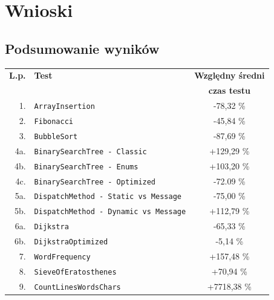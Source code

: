 \documentclass[mgr, shortabstract]{iithesis}
\begin{document}
\chapter{Wnioski}
\label{ch:wnioski}

\section{Podsumowanie wyników}

\begin{table}[!ht]
    \begin{tabularx}{1.0\textwidth}{ rXc } 
        \hline
        \textbf{L.p.} & \textbf{Test}  & \textbf{Względny średni} \\
                        &                & \textbf{czas testu} \\
        \hline
        1. & \texttt{ArrayInsertion}                         & \textcolor{MTGreen}{-78,32 \%}    \\ 
        2. & \texttt{Fibonacci}                              & \textcolor{MTGreen}{-45,84 \%}    \\ 
        3. & \texttt{BubbleSort}                             & \textcolor{MTGreen}{-87,69 \%}    \\ 
        4a. & \texttt{BinarySearchTree - Classic }            & \textcolor{MTRed}{+129,29 \%}     \\ 
        4b. & \texttt{BinarySearchTree - Enums }              & \textcolor{MTRed}{+103,20 \%}     \\ 
        4c. & \texttt{BinarySearchTree - Optimized}           & \textcolor{MTGreen}{-72.09 \%}    \\ 
        5a. & \texttt{DispatchMethod - Static vs Message}     & \textcolor{MTGreen}{-75,00 \%}    \\ 
        5b. & \texttt{DispatchMethod - Dynamic vs Message}    & \textcolor{MTRed}{+112,79 \%}     \\ 
        6a. & \texttt{Dijkstra}                               & \textcolor{MTGreen}{-65,33 \%}    \\ 
        6b. & \texttt{DijkstraOptimized}                      & \textcolor{MTGreen}{-5,14 \%}     \\ 
        7. & \texttt{WordFrequency}                          & \textcolor{MTRed}{+157,48 \%}     \\ 
        8. & \texttt{SieveOfEratosthenes}                    & \textcolor{MTRed}{+70,94 \%}      \\ 
        9. & \texttt{CountLinesWordsChars}                   & \textcolor{MTRed}{+7718,38 \%}    \\ 

\end{tabularx}
\end{table}
\end{document}
